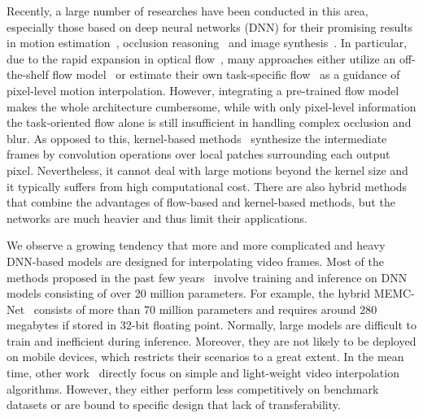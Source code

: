 \documentclass[final]{cvpr}
\begin{document}
Recently, a large number of researches have been conducted in this area, especially those based on deep neural networks (DNN) for their promising results in motion estimation~\cite{dosovitskiy2015flownet,ilg2017flownet,sun2018pwc,weinzaepfel2013deepflow}, occlusion reasoning~\cite{bao2019depth,jiang2018super,peleg2019net} and image synthesis~\cite{dosovitskiy2015learning,flynn2016deepstereo, kalantari2016learning,kulkarni2015deep,zhou2016view}. In particular, due to the rapid expansion in optical flow~\cite{baker2011database, werlberger2011optical}, many approaches either utilize an off-the-shelf flow model~\cite{bao2019depth,niklaus2018context,niklaus2020softmax,xu2019quadratic} or estimate their own task-specific flow~\cite{jiang2018super,liu2017video,xue2019video,yuan2019zoom,park2020bmbc} as a guidance of pixel-level motion interpolation. However, integrating a pre-trained flow model makes the whole architecture cumbersome, while with only pixel-level information the task-oriented flow alone is still insufficient in handling complex occlusion and blur. As opposed to this, kernel-based methods~\cite{niklaus2017video,niklaus2017video_sepcov,peleg2019net} synthesize the intermediate frames by convolution operations over local patches surrounding each output pixel. Nevertheless, it cannot deal with large motions beyond the kernel size and it typically suffers from high computational cost. There are also hybrid methods~\cite{bao2019depth,bao2019memc} that combine the advantages of flow-based and kernel-based methods, but the 
networks are much heavier and thus limit their applications.

We observe a growing tendency that more and more complicated and heavy DNN-based models are designed for interpolating video frames. Most of the methods proposed in the past few years~\cite{bao2019depth,bao2019memc,cheng2020video,choi2020channel,jiang2018super,lee2020adacof,niklaus2017video_sepcov,xu2019quadratic} involve training and inference on DNN models consisting of over 20 million parameters. For example, the hybrid MEMC-Net~\cite{bao2019memc} consists of more than 70 million parameters and requires around 280 megabytes if stored in 32-bit floating point. Normally, large models are difficult to train and inefficient during inference. Moreover, they are not likely to be deployed on mobile devices, which restricts their scenarios to a great extent. In the mean time, other work~\cite{chi2020all,liu2017video,xue2019video,yuan2019zoom} directly focus on simple and light-weight video interpolation algorithms. However, they either perform less competitively on benchmark datasets or are bound to specific design that lack of transferability.
\end{document}
